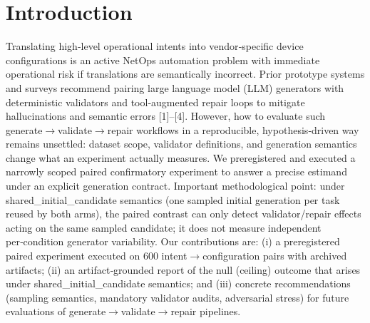 \documentclass[conference]{IEEEtran}
\begin{document}
\section{Introduction}
Translating high‑level operational intents into vendor‑specific device configurations is an active NetOps automation problem with immediate operational risk if translations are semantically incorrect. Prior prototype systems and surveys recommend pairing large language model (LLM) generators with deterministic validators and tool‑augmented repair loops to mitigate hallucinations and semantic errors [1]--[4]. However, how to evaluate such generate\ensuremath{\rightarrow}validate\ensuremath{\rightarrow}repair workflows in a reproducible, hypothesis‑driven way remains unsettled: dataset scope, validator definitions, and generation semantics change what an experiment actually measures. We preregistered and executed a narrowly scoped paired confirmatory experiment to answer a precise estimand under an explicit generation contract. Important methodological point: under shared\_initial\_candidate semantics (one sampled initial generation per task reused by both arms), the paired contrast can only detect validator/repair effects acting on the same sampled candidate; it does not measure independent per‑condition generator variability. Our contributions are: (i) a preregistered paired experiment executed on 600 intent\ensuremath{\rightarrow}configuration pairs with archived artifacts; (ii) an artifact‑grounded report of the null (ceiling) outcome that arises under shared\_initial\_candidate semantics; and (iii) concrete recommendations (sampling semantics, mandatory validator audits, adversarial stress) for future evaluations of generate\ensuremath{\rightarrow}validate\ensuremath{\rightarrow}repair pipelines.
\end{document}
